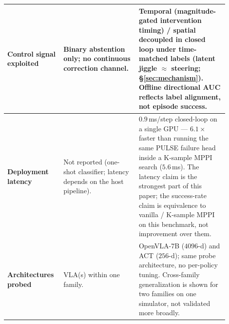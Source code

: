 \begin{table}[t]
\begin{tabular}{p{0.20\linewidth} p{0.32\linewidth} p{0.38\linewidth}}
\midrule
\textbf{Control signal exploited} &
Binary abstention only; no continuous correction channel. &
\textbf{Temporal} (magnitude-gated intervention timing) / \textbf{spatial decoupled} in closed loop under time-matched labels (latent jiggle $\approx$ steering; \S\ref{sec:mechanism}). Offline directional AUC reflects label alignment, not episode success. \\
\midrule
\textbf{Deployment latency} &
Not reported (one-shot classifier; latency depends on the host pipeline). &
$0.9$\,ms/step closed-loop on a single GPU --- $6.1\times$ faster than running the same PULSE failure head inside a K-sample MPPI search ($5.6$\,ms). The latency claim is the strongest part of this paper; the success-rate claim is equivalence to vanilla / K-sample MPPI on this benchmark, not improvement over them. \\
\midrule
\textbf{Architectures probed} &
VLA(s) within one family.                  &
OpenVLA-7B ($4096$-d) and ACT ($256$-d); same probe architecture, no per-policy tuning. Cross-family generalization is shown for two families on one simulator, not validated more broadly. \\
\bottomrule
\end{tabular}
\end{table}
